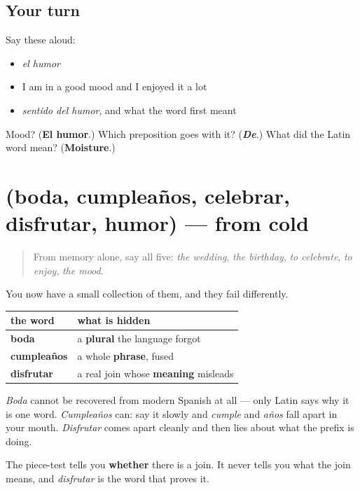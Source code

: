 \subsection*{Your turn}
Say these aloud:

\begin{itemize}
\raggedright
  \item \emph{el humor}
  \item I am in a good mood and I enjoyed it a lot
  \item \emph{sentido del humor}, and what the word first meant
\end{itemize}

\begin{tcolorbox}[breakable,colback=teal!4,colframe=teal!35!black,title={Before you move on}]
Mood? (\textbf{El humor}.) Which preposition goes with it? (\emph{\textbf{De}}.) What did the Latin word mean? (\textbf{Moisture}.)
\end{tcolorbox}
\section[(boda, cumpleaños, celebrar …]{(boda, cumpleaños, celebrar, disfrutar, humor) — from cold}

\label{lesson:ES-R440-repaso-fiesta}



\begin{quote}
From memory alone, say all five: \emph{the wedding}, \emph{the birthday}, \emph{to celebrate}, \emph{to enjoy}, \emph{the mood}.
\end{quote}

\begin{grammarlens}[title={Grammar Lens: three ways a word hides its pieces}]
You now have a small collection of them, and they fail differently.

\noindent
\begin{tabularx}{\linewidth}{@{}>{\raggedright\arraybackslash}X>{\raggedright\arraybackslash}X@{}}
\toprule
\textbf{the word} & \textbf{what is hidden} \\
\midrule
\textbf{boda} & a \textbf{plural} the language forgot \\
\textbf{cumpleaños} & a whole \textbf{phrase}, fused \\
\textbf{disfrutar} & a real join whose \textbf{meaning} misleads \\
\bottomrule
\end{tabularx}

\emph{Boda} cannot be recovered from modern Spanish at all — only Latin says why it is one word. \emph{Cumpleaños} can: say it slowly and \emph{cumple} and \emph{años} fall apart in your mouth. \emph{Disfrutar} comes apart cleanly and then lies about what the prefix is doing.

The piece-test tells you \textbf{whether} there is a join. It never tells you what the join means, and \emph{disfrutar} is the word that proves it.
\end{grammarlens}


